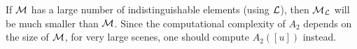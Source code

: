 If $\mathcal{M}$ has a large number of indistinguishable elements (using $\mathcal{L}$), then
 $\mathcal{M}_{\mathcal{L}}$ will be much smaller than $\mathcal{M}$. Since the computational complexity of
 $A_2$ depends on the size of $\mathcal{M}$, for very large scenes, one should compute
 $A_2([u])$ instead.

%
%

